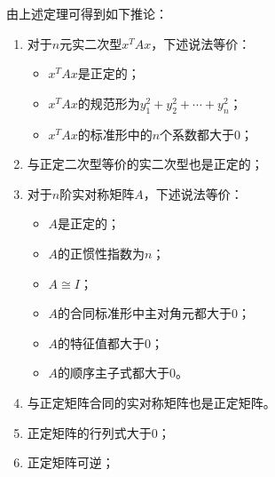 \begin{theorem}\label{theo:PositiveDefinite}
	由上述定理可得到如下推论：
	\begin{enumerate}
		\item 对于$n$元实二次型$x^TAx$，下述说法等价：
		\begin{itemize}
			\item $x^TAx$是正定的；
			\item $x^TAx$的规范形为$y_1^2+y_2^2+\cdots+y_n^2$；
			\item $x^TAx$的标准形中的$n$个系数都大于$0$；
		\end{itemize}
		\item 与正定二次型等价的实二次型也是正定的；
		\item 对于$n$阶实对称矩阵$A$，下述说法等价：
		\begin{itemize}
			\item $A$是正定的；
			\item $A$的正惯性指数为$n$；
			\item $A\cong I$；
			\item $A$的合同标准形中主对角元都大于$0$；
			\item $A$的特征值都大于$0$；
			\item $A$的顺序主子式都大于$0$。
		\end{itemize}
		\item 与正定矩阵合同的实对称矩阵也是正定矩阵。
		\item 正定矩阵的行列式大于$0$；
		\item 正定矩阵可逆；
	\end{enumerate}
\end{theorem}
